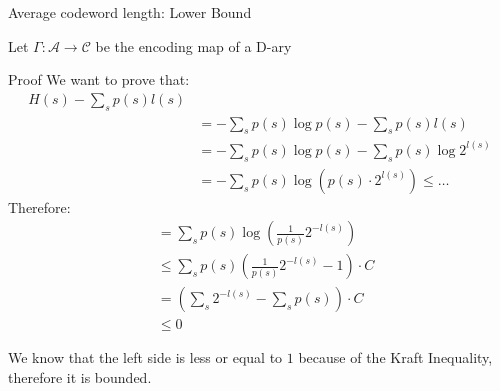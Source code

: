\begin{parag}{Average codeword length: Lower Bound}
    \begin{theoreme}
        Let $ \Gamma : \mathcal{A} \to \mathcal{C}$ be the encoding map of a D-ary
    \end{theoreme}
    \begin{subparag}{Proof}
        We want to prove that:
        \begin{align*}
            H(s) - \sum_s p(s)l(s) \\
            &= - \sum_s p(s) \log p(s) - \sum_s p(s)l(s) \\
            &= - \sum_s p(s)\log p(s) - \sum_s p(s) \log 2^{l(s)} \\
            &= -\sum_s p(s) \log (p(s) \cdot 2^{l(s)}) \leq \dots
        \end{align*}
        Therefore:
        \begin{align*}
            &= \sum_s p(s) \log ( \frac{1}{p(s)}2^{-l(s)}) \\
            &\leq \sum_s p(s) \left( \frac{1}{p(s)}2^{-l(s)} -1 \right) \cdot C \\
            &= (\sum_s 2^{-l(s)} - \sum_s p(s)) \cdot C \\
            &\leq 0
        \end{align*}
        
        We know that the left side is less or equal to $1$ because of the Kraft Inequality, therefore it is bounded.
        
    \end{subparag}
\end{parag}




